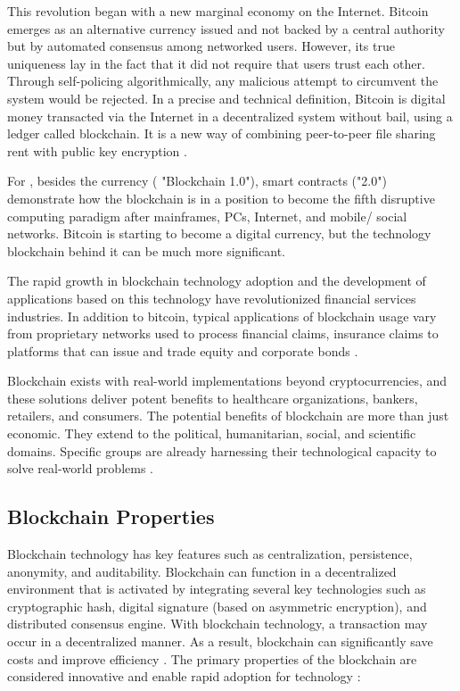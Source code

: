 This revolution began with a new marginal economy on the Internet. Bitcoin emerges as an alternative currency issued and not backed by a central authority but by automated consensus among networked users. However, its true uniqueness lay in the fact that it did not require that users trust each other. Through self-policing algorithmically, any malicious attempt to circumvent the system would be rejected. In a precise and technical definition, Bitcoin is digital money transacted via the Internet in a decentralized system without bail, using a ledger called blockchain. It is a new way of combining peer-to-peer file sharing rent with public key encryption \cite{swan2015blockchain}.

For \cite{swan2015blockchain}, besides the currency ( "Blockchain 1.0"), smart contracts ("2.0") demonstrate how the blockchain is in a position to become the fifth disruptive computing paradigm after mainframes, PCs, Internet, and mobile/ social networks. Bitcoin is starting to become a digital currency, but the technology blockchain behind it can be much more significant.

The rapid growth in blockchain technology adoption and the development of applications based on this technology have revolutionized financial services industries. In addition to bitcoin, typical applications of blockchain usage vary from proprietary networks used to process financial claims, insurance claims to platforms that can issue and trade equity and corporate bonds \cite{michael2018blockchain}.

Blockchain exists with real-world implementations beyond cryptocurrencies, and these solutions deliver potent benefits to healthcare organizations, bankers, retailers, and consumers. The potential benefits of blockchain are more than just economic. They extend to the political, humanitarian, social, and scientific domains. Specific groups are already harnessing their technological capacity to solve real-world problems \cite{michael2018blockchain}.



\subsection{Blockchain Properties}\label{sec:propriedades}

Blockchain technology has key features such as centralization, persistence, anonymity, and auditability. Blockchain can function in a decentralized environment that is activated by integrating several key technologies such as cryptographic hash, digital signature (based on asymmetric encryption), and distributed consensus engine. With blockchain technology, a transaction may occur in a decentralized manner. As a result, blockchain can significantly save costs and improve efficiency \cite{zheng2016blockchain}. The primary properties of the blockchain are considered innovative and enable rapid adoption for technology \cite{greve2018blockchain}:

